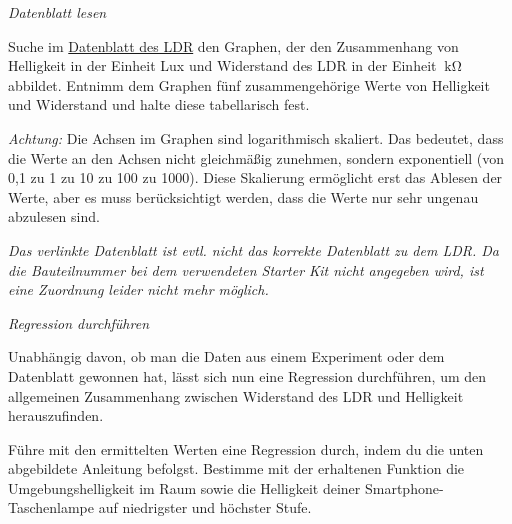 \begin{aufgabe} \emph{Datenblatt lesen}
	
	Suche im \href{https://components101.com/sites/default/files/component_datasheet/LDR%20Datasheet.pdf}{Datenblatt des LDR}
	den Graphen, der den Zusammenhang von Helligkeit in der Einheit Lux und Widerstand des LDR in der Einheit $\SI{}{\kilo\ohm}$ abbildet. Entnimm dem Graphen fünf zusammengehörige Werte von Helligkeit und Widerstand und halte diese tabellarisch fest.
	
	\smallskip
	\begin{minipage}{0.78\textwidth}
		\emph{Achtung:} Die Achsen im Graphen sind logarithmisch skaliert. Das bedeutet, dass die Werte an den Achsen nicht gleichmäßig zunehmen, sondern exponentiell (von 0,1 zu 1 zu 10 zu 100 zu 1000). Diese Skalierung ermöglicht erst das Ablesen der Werte, aber es muss berücksichtigt werden, dass die Werte nur sehr ungenau abzulesen sind.
	\end{minipage}
	\hfill
	\begin{minipage}{0.2\textwidth}
	\end{minipage}
		
	\smallskip
	\textit{\small Das verlinkte Datenblatt ist evtl. nicht das korrekte Datenblatt zu dem LDR. Da die Bauteilnummer bei dem verwendeten Starter Kit nicht angegeben wird, ist eine Zuordnung leider nicht mehr möglich.}
\end{aufgabe}

\begin{aufgabe} \emph{Regression durchführen}
	
	Unabhängig davon, ob man die Daten aus einem Experiment oder dem Datenblatt gewonnen hat, lässt sich nun eine Regression durchführen, um den allgemeinen Zusammenhang zwischen Widerstand des LDR und Helligkeit herauszufinden.
	
	Führe mit den ermittelten Werten eine Regression durch, indem du die unten abgebildete Anleitung befolgst. Bestimme mit der erhaltenen Funktion die Umgebungshelligkeit im Raum sowie die Helligkeit deiner Smartphone-Taschenlampe auf niedrigster und höchster Stufe.
\end{aufgabe}

